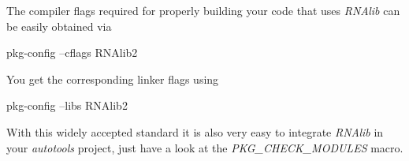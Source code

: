 The compiler flags required for properly building your code that uses {\itshape R\+N\+Alib} can be easily obtained via

\begin{DoxyVerb}pkg-config --cflags RNAlib2
\end{DoxyVerb}


You get the corresponding linker flags using

\begin{DoxyVerb}pkg-config --libs RNAlib2
\end{DoxyVerb}


With this widely accepted standard it is also very easy to integrate {\itshape R\+N\+Alib} in your {\itshape autotools} project, just have a look at the {\itshape P\+K\+G\+\_\+\+C\+H\+E\+C\+K\+\_\+\+M\+O\+D\+U\+L\+ES} macro. 